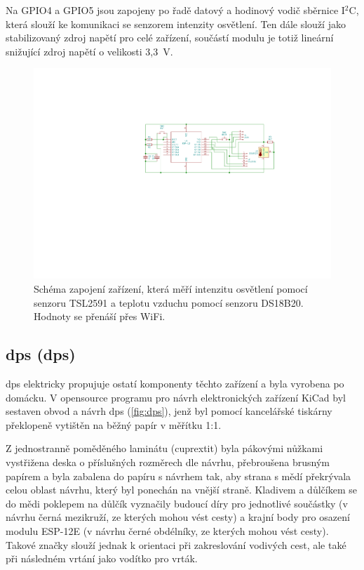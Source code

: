         Na GPIO4 a GPIO5 jsou zapojeny po řadě datový a hodinový vodič sběrnice I$^2$C, která slouží ke komunikaci se senzorem intenzity osvětlení. Ten dále slouží jako stabilizovaný zdroj napětí pro celé zařízení, součástí modulu je totiž lineární snižující zdroj napětí o velikosti 3{,}3~V.
        \begin{figure}
            \centering
            \includegraphics[draft=true,width=\textwidth,trim={10.8cm 10cm 5.5cm 5.3cm},clip]{img/hw/esp_lux_temp_sch.pdf}
            \caption[Schéma zapojení měřicích zařízení]{Schéma zapojení zařízení, která měří intenzitu osvětlení pomocí senzoru TSL2591 a teplotu vzduchu pomocí senzoru DS18B20. Hodnoty se přenáší přes WiFi.}
            \label{fig:schema}
        \end{figure}
    \subsection{\Acrlong{dps} (\acrshort{dps})}
        \acrshort{dps} elektricky propujuje ostatí komponenty těchto zařízení a byla vyrobena po domácku. V opensource programu pro návrh elektronických zařízení KiCad byl sestaven obvod a návrh \acrshort{dps} (\cref{fig:dps}), jenž byl pomocí kancelářské tiskárny překlopeně vytištěn na běžný papír v měřítku 1:1.
        
        Z jednostranně poměděného laminátu (cuprextit) byla pákovými nůžkami vystřižena deska o příslušných rozměrech dle návrhu, přebroušena brusným papírem a byla zabalena do papíru s návrhem tak, aby strana s mědí překrývala celou oblast návrhu, který byl ponechán na vnější straně. Kladivem a důlčíkem se do mědi poklepem na důlčík vyznačily budoucí díry pro jednotlivé součástky (v návrhu černá mezikruží, ze kterých mohou vést cesty) a krajní body pro osazení modulu ESP-12E (v návrhu černé obdélníky, ze kterých mohou vést cesty). Takové značky slouží jednak k orientaci při zakreslování vodivých cest, ale také při následném vrtání jako vodítko pro vrták.
        
